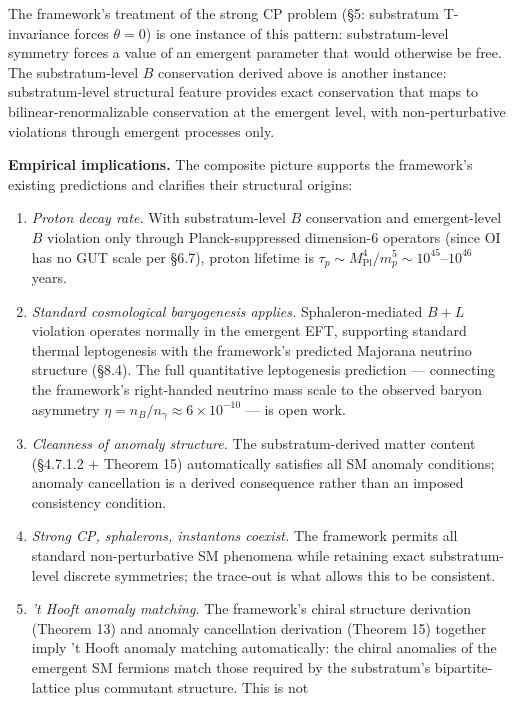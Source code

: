 \documentclass[
]{article}
\begin{document}
The framework's treatment of the strong CP problem (§5: substratum
T-invariance forces \(\theta = 0\)) is one instance of this pattern:
substratum-level symmetry forces a value of an emergent parameter that
would otherwise be free. The substratum-level \(B\) conservation derived
above is another instance: substratum-level structural feature provides
exact conservation that maps to bilinear-renormalizable conservation at
the emergent level, with non-perturbative violations through emergent
processes only.

\textbf{Empirical implications.} The composite picture supports the
framework's existing predictions and clarifies their structural origins:

\begin{enumerate}
\def\labelenumi{(\roman{enumi})}
\item
  \emph{Proton decay rate.} With substratum-level \(B\) conservation and
  emergent-level \(B\) violation only through Planck-suppressed
  dimension-6 operators (since OI has no GUT scale per §6.7), proton
  lifetime is
  \(\tau_p \sim M_{\mathrm{Pl}}^4/m_p^5 \sim 10^{45}\)--\(10^{46}\)
  years.
\item
  \emph{Standard cosmological baryogenesis applies.} Sphaleron-mediated
  \(B+L\) violation operates normally in the emergent EFT, supporting
  standard thermal leptogenesis with the framework's predicted Majorana
  neutrino structure (§8.4). The full quantitative leptogenesis
  prediction --- connecting the framework's right-handed neutrino mass
  scale to the observed baryon asymmetry
  \(\eta = n_B/n_\gamma \approx 6 \times 10^{-10}\) --- is open work.
\item
  \emph{Cleanness of anomaly structure.} The substratum-derived matter
  content (§4.7.1.2 + Theorem 15) automatically satisfies all SM anomaly
  conditions; anomaly cancellation is a derived consequence rather than
  an imposed consistency condition.
\item
  \emph{Strong CP, sphalerons, instantons coexist.} The framework
  permits all standard non-perturbative SM phenomena while retaining
  exact substratum-level discrete symmetries; the trace-out is what
  allows this to be consistent.
\item
  \emph{'t Hooft anomaly matching.} The framework's chiral structure
  derivation (Theorem 13) and anomaly cancellation derivation (Theorem
  15) together imply 't Hooft anomaly matching automatically: the chiral
  anomalies of the emergent SM fermions match those required by the
  substratum's bipartite-lattice plus commutant structure. This is not

\end{enumerate}
\end{document}
